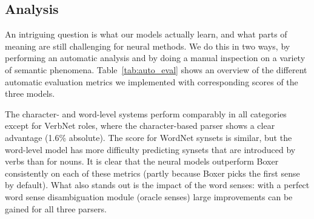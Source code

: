 \documentclass[11pt,a4paper]{article}
\begin{document}
\subsection{Analysis}
\label{sec:analysis}

An intriguing question is what our
models actually learn, and what parts of meaning are still challenging for neural methods. We do this in two ways, by performing an automatic analysis and by doing a manual inspection on a variety of semantic phenomena. Table~\ref{tab:auto_eval} shows an overview of the different automatic evaluation metrics we implemented with corresponding scores of the three models.


\begin{table}[!t]
\centering
{}
\caption{F-scores of fine-grained evaluation on the test set of the three semantic parsers.}
\label{tab:auto_eval}
\end{table}

The character- and word-level systems perform comparably in all categories except for VerbNet roles, where the character-based parser shows a clear advantage (1.6\% absolute).
The score for WordNet synsets is similar, but the word-level model has more difficulty predicting synsets that are introduced by verbs than for nouns. It is clear that the neural models outperform Boxer consistently on each of these metrics (partly because Boxer picks the first sense by default). What also stands out is the impact of the word senses: with a perfect word sense disambiguation module (oracle senses) large improvements can be gained for all three parsers.
\end{document}
